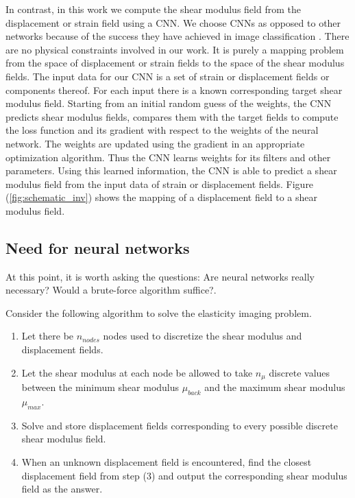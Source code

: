\documentclass[10pt]{article}
\begin{document}
In contrast, in this work we compute the shear modulus field from the displacement or strain field using a CNN. We choose CNNs as opposed to other networks because of the success they have achieved in image classification \cite{paper:hinton2017}. There are no physical constraints involved in our work. It is purely a mapping problem from the space of displacement or strain fields to the space of the shear modulus fields. The input data for our CNN is a set of strain or displacement fields or components thereof. For each input there is a known corresponding target shear modulus field. Starting from an initial random guess of the weights, the CNN predicts shear modulus fields, compares them with the target fields to compute the loss function and its gradient with respect to the weights of the neural network. The weights are updated using the gradient in an appropriate optimization algorithm. Thus the CNN learns weights for its filters and other parameters. Using this learned information, the CNN is able to predict a shear modulus field from the input data of strain or displacement fields. Figure (\ref{fig:schematic_inv}) shows the mapping of a displacement field to a shear modulus field.\\
\subsection{Need for neural networks}
At this point, it is worth asking the questions: Are neural networks really necessary? Would a brute-force algorithm suffice?.

Consider the following algorithm to solve the elasticity imaging problem.
%
\begin{enumerate}
\item{Let there be $n_{nodes}$ nodes used to discretize the shear modulus and displacement fields.}
\item{Let the shear modulus at each node be allowed to take $n_{\mu}$ discrete values between the minimum shear modulus $\mu_{back}$ and the maximum shear modulus $\mu_{max}$.}
\item{Solve and store displacement fields corresponding to every possible discrete shear modulus field.}
\item{When an unknown displacement field is encountered, find the closest displacement field from step (3) and output the corresponding shear modulus field as the answer.}
\end{enumerate}
\end{document}
